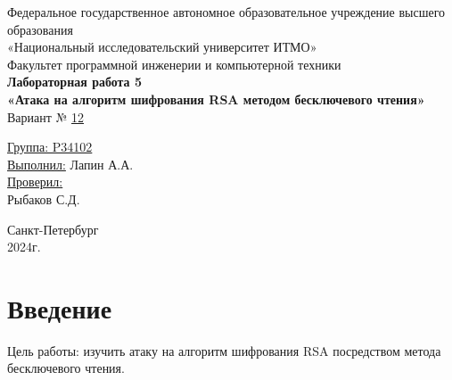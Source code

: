 \documentclass[a4paper, 14pt]{report}
\begin{document}
\begin{titlepage}
    \centering
    {\large Федеральное государственное автономное образовательное учреждение высшего образования}\\
    {\large «Национальный исследовательский университет ИТМО»}\\[0.5cm]

    {\large Факультет программной инженерии и компьютерной техники}\\[3cm]

    {\large \bfseries Лабораторная работа 5}\\[0.5cm]
    {\large \bfseries «Атака на алгоритм шифрования RSA методом бесключевого
    чтения»}\\[1cm]

    {\large Вариант № \underline{12}}\\[5cm]
    \begin{flushright}
        {\large \underline{Группа: P34102}}\\[0.5cm]
        {\large \underline{Выполнил:} Лапин А.А.}\\[1cm]

        {\large \underline{Проверил:}}\\
        {\large Рыбаков С.Д.}\\[9cm]
    \end{flushright}

    {\large Санкт-Петербург}\\
    {\large 2024г.}
\end{titlepage}

\setcounter{page}{2}
\tableofcontents
\newpage

\chapter*{Введение}
{}
Цель работы: изучить атаку на алгоритм шифрования RSA посредством метода бесключевого чтения.
\end{document}
